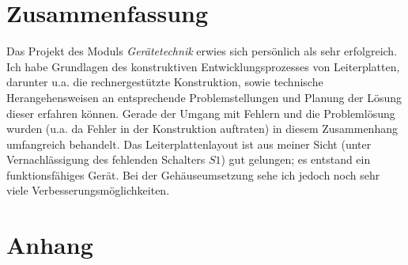 \documentclass[a4paper, 12pt]{article}
\begin{document}
\section{Zusammenfassung}
Das Projekt des Moduls \emph{Gerätetechnik} erwies sich persönlich als sehr erfolgreich. Ich habe Grundlagen des konstruktiven Entwicklungsprozesses von Leiterplatten, darunter u.a. die rechnergestützte Konstruktion, sowie technische Herangehensweisen an entsprechende Problemstellungen und Planung der Lösung dieser erfahren können. Gerade der Umgang mit Fehlern und die Problemlösung wurden (u.a. da Fehler in der Konstruktion auftraten) in diesem Zusammenhang umfangreich behandelt. Das Leiterplattenlayout ist aus meiner Sicht (unter Vernachlässigung des fehlenden Schalters $S1$) gut gelungen; es entstand ein funktionsfähiges Gerät. Bei der Gehäuseumsetzung sehe ich jedoch noch sehr viele Verbesserungsmöglichkeiten.

\appendix
\section{Anhang}















\end{document}
